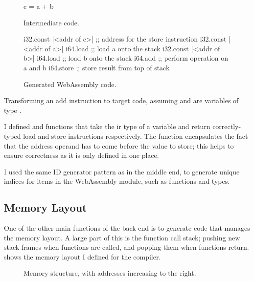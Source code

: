\documentclass[00-main.tex]{subfiles}
\begin{document}
\begin{listing}[h]
  \begin{subfigure}[b]{0.28\textwidth}
    \begin{IrCodeListing}
      c = a + b
    \end{IrCodeListing}
    \caption{Intermediate code.}
  \end{subfigure}
  \hfill
  \begin{subfigure}[b]{0.7\textwidth}
    \begin{WasmListing}
      i32.const |<addr of c>|  ;; address for the store instruction
      i32.const |<addr of a>|
      i64.load               ;; load a onto the stack
      i32.const |<addr of b>|
      i64.load               ;; load b onto the stack
      i64.add                ;; perform operation on a and b
      i64.store              ;; store result from top of stack
    \end{WasmListing}
    \caption{Generated WebAssembly code.}
  \end{subfigure}
  \caption{Transforming an add instruction to target code, assuming  and  are variables of type .}
  \label{lst:converting add instr to wasm code}
\end{listing}

I defined  and  functions that take the \gls{ir} type of a variable and return correctly-typed load and store instructions respectively.
The  function encapsulates the fact that the address operand has to come before the value to store; this helps to ensure correctness as it is only defined in one place.

I used the same ID generator pattern as in the middle end, to generate unique indices for items in the WebAssembly module, such as functions and types.

\subsection{Memory Layout}

One of the other main functions of the back end is to generate code that manages the memory layout.
A large part of this is the function call stack; pushing new stack frames when functions are called, and popping them when functions return.
 shows the memory layout I defined for the compiler.

\begin{figure}[ht]
  \centering
  \caption{Memory structure, with addresses increasing to the right.}
  \label{fig:memory structure}
\end{figure}
\end{document}
